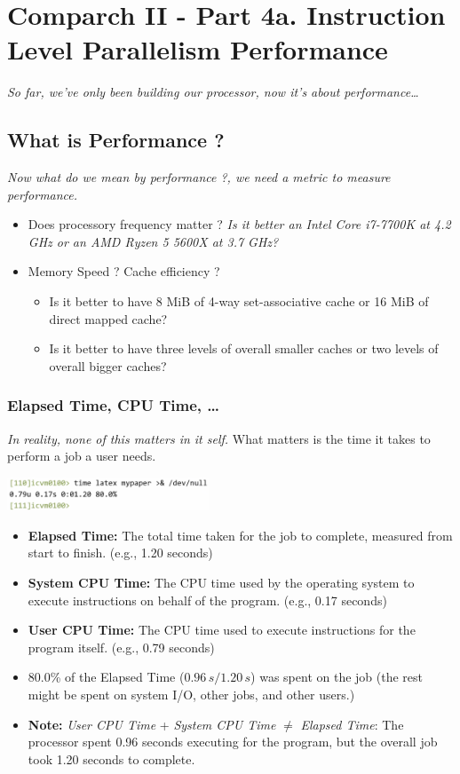 \chapter{Comparch II - Part 4a. Instruction Level Parallelism Performance}
\textit{So far, we've only been building our processor, now it's about performance\dots}
\section{What is Performance ?}
\textit{Now what do we mean by performance ?, we need a metric to measure performance.}
\begin{itemize}
    \item[] Does processory frequency matter ? \textit{Is it better an Intel Core i7-7700K at 4.2 GHz or an AMD Ryzen 5 5600X at 3.7 GHz?}
    \item[] Memory Speed ? Cache efficiency ?
    \begin{itemize}
        \item[] Is it better to have 8 MiB of 4-way set-associative cache or 16 MiB of direct
        mapped cache?
        \item[] Is it better to have three levels of overall smaller caches or two levels of overall
        bigger caches?
    \end{itemize}
\end{itemize}
\subsection{Elapsed Time, CPU Time, \dots}
\textit{In reality, none of this matters in it self.}
What matters is the time it takes to perform a job a user needs.
\begin{center}
    \includegraphics[width=0.45\textwidth]{chapters/chapter4a/images/elapsed.png}
\end{center}

\begin{itemize}
    \item \textbf{Elapsed Time:} The total time taken for the job to complete, measured from start to finish. (e.g., 1.20 seconds)
    \item \textbf{System CPU Time:} The CPU time used by the operating system to execute instructions on behalf of the program. (e.g., 0.17 seconds)
    \item \textbf{User CPU Time:} The CPU time used to execute instructions for the program itself. (e.g., 0.79 seconds)
    \item 80.0\% of the Elapsed Time ($0.96\,s / 1.20\,s$) was spent on the job (the rest might be spent on system I/O, other jobs, and other users.)
    \item \textbf{Note:} \textit{User CPU Time} + \textit{System CPU Time} $\neq$ \textit{Elapsed Time}: The processor spent 0.96 seconds executing for the program, but the overall job took 1.20 seconds to complete.
\end{itemize}

